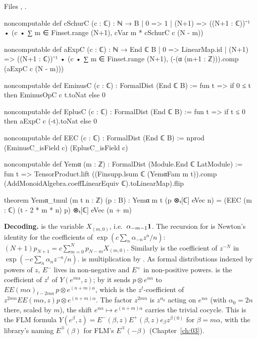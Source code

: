 \noindent Files , .
\begin{leancode}
noncomputable def cSchurC (c : ℂ) : ℕ → B
  | 0 => 1
  | (N+1) => ((N+1 : ℂ))⁻¹ • (c • ∑ m ∈ Finset.range (N+1), cVar m * cSchurC c (N - m))

noncomputable def aExpC (c : ℂ) : ℕ → End ℂ B
  | 0 => LinearMap.id
  | (N+1) => ((N+1 : ℂ))⁻¹ • (c • ∑ m ∈ Finset.range (N+1), (-(α (m+1 : ℤ))).comp (aExpC c (N - m)))

noncomputable def EminusC (c : ℂ) : FormalDist (End ℂ B) :=
  fun t => if 0 ≤ t then EminusOpC c t.toNat else 0

noncomputable def EplusC (c : ℂ) : FormalDist (End ℂ B) :=
  fun t => if t ≤ 0 then aExpC c (-t).toNat else 0

noncomputable def EEC (c : ℂ) : FormalDist (End ℂ B) := nprod (EminusC_isField c) (EplusC_isField c)

noncomputable def Yemα (m : ℤ) : FormalDist (Module.End ℂ LatModule) := fun t =>
  TensorProduct.lift ((Finsupp.lsum ℂ (YemαFam m t)).comp
    (AddMonoidAlgebra.coeffLinearEquiv ℂ).toLinearMap).flip

theorem Yemα_tmul (m t n : ℤ) (p : B) :
    Yemα m t (p ⊗ₜ[ℂ] eVec n) = (EEC (m : ℂ) (t - 2 * m * n) p) ⊗ₜ[ℂ] eVec (n + m)
\end{leancode}

\begin{dictionary}
\textbf{Decoding.}  is the variable $X_{(m,0)}$, i.e.\ $\alpha_{-m-1}\mathbf{1}$. The recursion for
 is Newton's identity for the coefficients of $\exp(c\sum_n\alpha_{-n}z^n/n)$:
$(N+1)p_{N+1}=c\sum_{m=0}^Np_{N-m}X_{(m,0)}$. Similarly  is the coefficient of $z^{-N}$ in
$\exp(-c\sum_n\alpha_nz^{-n}/n)$.  is multiplication by . As formal
distributions indexed by powers of $z$, $E^-$ lives in non-negative and $E^+$ in non-positive powers.
 is the coefficient of $z^t$ of $Y(e^{m\alpha},z)$; by  it sends
$p\otimes e^{n\alpha}$ to $EE(m\alpha)_{t-2mn}\,p\otimes e^{(n+m)\alpha}$, which is the $z^t$-coefficient of
$z^{2mn}EE(m\alpha,z)p\otimes e^{(n+m)\alpha}$. The factor $z^{2mn}$ is $z^{\alpha_0}$ acting on $e^{n\alpha}$ (with
$\alpha_0=2n$ there, scaled by $m$), the shift $e^{n\alpha}\mapsto e^{(n+m)\alpha}$ carries the trivial cocycle. This is
the FLM formula $Y(e^\beta,z)=E^-(\beta,z)E^+(\beta,z)e_\beta z^{\beta(0)}$ for $\beta=m\alpha$, with the library's
naming $E^\mp(\beta)$ for FLM's $E^\mp(-\beta)$ (Chapter~\ref{ch:03}).
\end{dictionary}


